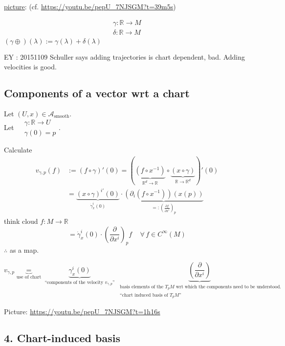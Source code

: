 	
	\underline{picture}: (cf. \url{https://youtu.be/pepU_7NJSGM?t=39m5s})
	
	\[
	\begin{aligned} 
	\gamma : \mathbb{R} \to M \\
	\delta : \mathbb{R} \to M \end{aligned}
	\]
	$(\gamma \oplus)(\lambda) := \gamma(\lambda) + \delta(\lambda)$
	
	EY : 20151109 Schuller says adding trajectories is chart dependent, bad. Adding velocities is good.  
	\subsection{Components of a vector wrt a chart}
	
	\begin{definition}
		Let $(U,x) \in \mathcal{A}_{\text{smooth}}$.  \\
		Let $\begin{aligned} & \gamma : \mathbb{R} \to U \\ 
		& \gamma(0) = p \end{aligned}$.  
		
		Calculate 
		\[
		\begin{aligned} 
		v_{\gamma,p}(f) & := (f \circ \gamma)'(0) = (\underbrace{ (f\circ x^{-1}) }_{\mathbb{R}^d \to \mathbb{R} }  \circ \underbrace{ (x\circ \gamma)}_{\mathbb{R} \to \mathbb{R}^d}  )'(0) \\
		& = \underbrace{ (x\circ \gamma)^{i'}(0) }_{\dot{\gamma}_x^i(0) }  \cdot \underbrace{ (\partial_i(f\circ x^{-1} ) )(x(p))  }_{ =: \left( \frac{ \partial f}{ \partial x^i } \right)_p }
		\end{aligned}
		\]
		think cloud $f:M\to \mathbb{R}$
		\[
		= \boxed{ \dot{\gamma}_x^i(0) \cdot \left( \frac{ \partial }{ \partial x^i} \right)_p } f \quad \, \forall \, f \in C^{\infty}(M)
		\]
		$\therefore$ as a map.  
		
		\[
		v_{\gamma,p} \underbrace{=}_{\text{use of chart} } \underbrace{ \gamma_x^i(0) }_{ \text{ ``components of the velocity $v_{\gamma,p}$'' } } \underbrace{ \left( \frac{ \partial }{ \partial x^i} \right)}_{ \substack{ \text{ basis elements of the $T_pM$ wrt which the components need to be understood.} \\
				\text{ ``chart induced basis of $T_pM$''} } } 
		\]
	\end{definition}
	
	Picture: \url{https://youtu.be/pepU_7NJSGM?t=1h16s}
	
	\subsection{4. Chart-induced basis}
	
